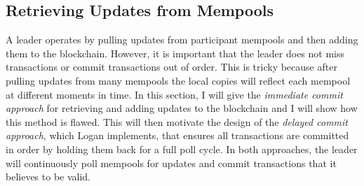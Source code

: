 \documentclass[12pt,a4paper,twoside,openright]{report}
\begin{document}
	\subsection{Retrieving Updates from Mempools}
	A leader operates by pulling updates from participant mempools and then adding them to the blockchain.
	However, it is important that the leader does not miss transactions or commit transactions out of order.
	This is tricky because after pulling updates from many mempools the local copies will reflect each mempool at different moments in time.
	In this section, I will give the \textit{immediate commit approach} for retrieving and adding updates to the blockchain and I will show how this method is flawed. 
	This will then motivate the design of the \textit{delayed commit approach}, which Logan implements, that ensures all transactions are committed in order by holding them back for a full poll cycle.
	In both approaches, the leader will continuously poll mempools for updates and commit transactions that it believes to be valid. \\
	
\end{document}
